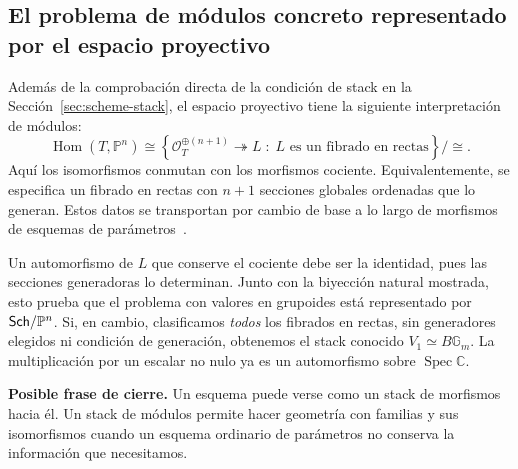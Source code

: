 \documentclass[12pt,openany]{memoir}
\begin{document}
\subsection{El problema de módulos concreto representado por el espacio proyectivo}

Además de la comprobación directa de la condición de stack en la
Sección~\ref{sec:scheme-stack}, el espacio proyectivo tiene la siguiente
interpretación de módulos:
\[
 \operatorname{Hom}(T,\mathbb P^n)
 \cong
 \left\{
   \mathcal O_T^{\oplus(n+1)}\twoheadrightarrow L
   \;:\;L\text{ es un fibrado en rectas}
 \right\}\big/\cong.
\]
Aquí los isomorfismos conmutan con los morfismos cociente. Equivalentemente,
se especifica un fibrado en rectas con \(n+1\) secciones globales
ordenadas que lo generan. Estos datos se transportan por cambio de base a lo
largo de morfismos de esquemas de parámetros~\cite{sp:projective}.

Un automorfismo de \(L\) que conserve el cociente debe ser la identidad,
pues las secciones generadoras lo determinan. Junto con la biyección
natural mostrada, esto prueba que el problema con valores en grupoides
está representado por \(\mathsf{Sch}/\mathbb P^n\). Si, en cambio, clasificamos
\emph{todos} los fibrados en rectas, sin generadores elegidos ni condición
de generación, obtenemos el stack conocido \(V_1\simeq B\mathbb G_m\).
La multiplicación por un escalar no nulo ya es un automorfismo sobre
\(\operatorname{Spec}\mathbb C\).

\begin{ptcb}
\textbf{Posible frase de cierre.}
Un esquema puede verse como un stack de morfismos hacia él. Un stack de
módulos permite hacer geometría con familias y sus isomorfismos cuando
un esquema ordinario de parámetros no conserva la información que
necesitamos.
\end{ptcb}
\end{document}
